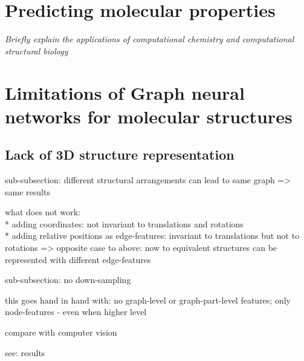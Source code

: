 %
%


\section{Predicting molecular properties}

\textit{Briefly explain the applications of computational chemistry and computational structural biology} 


\section{Limitations of Graph neural networks for molecular structures}

\subsection{Lack of 3D structure representation}

{\itshape
	
sub-subsection: different structural arrangements can lead to same graph => same results

what does not work:\\
* adding coordinates: not invariant to translations and rotations\\
* adding relative positions as edge-features: invariant to translations but not to rotations
=> opposite case to above: now to equivalent structures can be represented with different edge-features

sub-subsection: no down-sampling

this goes hand in hand with: no graph-level or graph-part-level features; only node-features - even when higher level

compare with computer vision

see: results
	}
	
	


